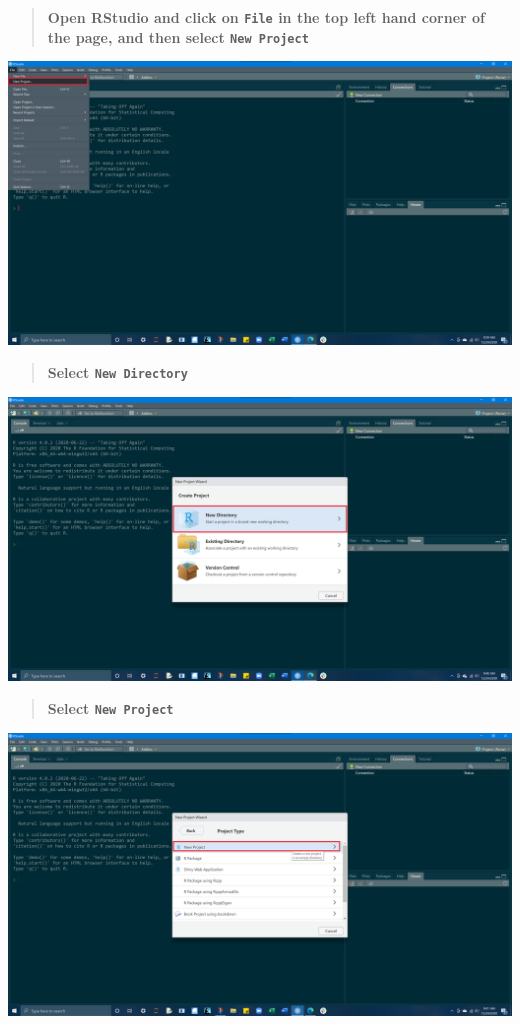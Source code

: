 \documentclass[
]{article}
\begin{document}
\begin{quote}
\textbf{Open RStudio and click on \texttt{File} in the top left hand
corner of the page, and then select \texttt{New\ Project}}
\end{quote}

\includegraphics{img/open-new-rproj.png}

\begin{quote}
\textbf{Select \texttt{New\ Directory}}
\end{quote}

\includegraphics{img/select-new-dir.png}

\begin{quote}
\textbf{Select \texttt{New\ Project}}
\end{quote}

\includegraphics{img/select-proj-type.png}
\end{document}
